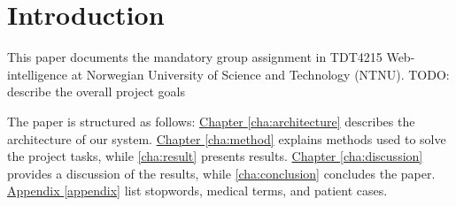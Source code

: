 \chapter{Introduction}
This paper documents the mandatory group assignment in TDT4215 Web-intelligence
at Norwegian University of Science and Technology (NTNU).
TODO: describe the overall project goals

The paper is structured as follows:
\hyperref[cha:architecture]{Chapter \ref*{cha:architecture}} describes the
architecture of our system.
\hyperref[cha:method]{Chapter \ref*{cha:method}} explains methods used to
solve the project tasks, while \autoref{cha:result} presents results.
\hyperref[cha:discussion]{Chapter \ref*{cha:discussion}} provides a discussion
of the results, while \autoref{cha:conclusion} concludes the paper.
\hyperref[appendix]{Appendix \ref*{appendix}} list stopwords, medical terms,
and patient cases.
